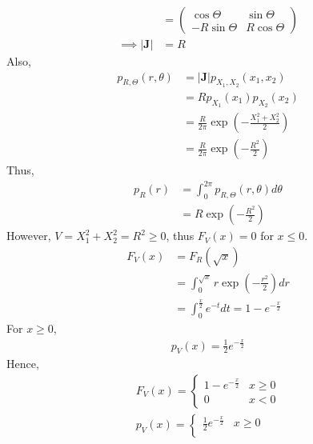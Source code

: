 \documentclass[journal,12pt,twocolumn]{IEEEtran}
\numberwithin{equation}{section}
\renewcommand\thesection{\arabic{section}}
\providecommand{\brak}[1]{\ensuremath{\left(#1\right)}}
\providecommand{\mtx}[1]{\mathbf{#1}}
\newcommand{\myvec}[1]{\ensuremath{\begin{pmatrix}#1\end{pmatrix}}}
\begin{document}
\begin{enumerate}[label=\thesection.\arabic*
        ,ref=\thesection.\theenumi]
\begin{align}
                                 & = \myvec{\cos{\Theta}   & \sin{\Theta}   \\ -R\sin{\Theta}     & R\cos{\Theta}}              \\
              \implies |\mtx{J}| & = R
          \end{align}
          Also,
          \begin{align}
              p_{R, \Theta}(r, \theta) & = |\mtx{J}|p_{X_1, X_2}(x_1, x_2)                     \\
                                       & = Rp_{X_1}(x_1)p_{X_2}(x_2)                           \\
                                       & = \frac{R}{2\pi}\exp{\brak{-\frac{X_1^2 + X_2^2}{2}}} \\
                                       & = \frac{R}{2\pi}\exp{\brak{-\frac{R^2}{2}}}
              \label{eq:joint}
          \end{align}
          Thus,
          \begin{align}
              p_R(r) & = \int_{0}^{2\pi}p_{R, \Theta}(r, \theta) d\theta \\
                     & = R\exp{\brak{-\frac{R^2}{2}}}
          \end{align}
          However, $V = X_1^2 + X_2^2 = R^2 \geq 0$, thus $F_V(x) = 0$ for $x \leq 0$.
          \begin{align}
              F_V(x) & = F_R(\sqrt{x})                                         \\
                     & = \int_{0}^{\sqrt{x}}r\exp{\brak{-\frac{r^2}{2}}}dr     \\
                     & = \int_{0}^{\frac{x}{2}}e^{-t}dt = 1 - e^{-\frac{x}{2}}
          \end{align}
          For $x \geq 0$,
          \begin{align}
              p_V(x) = \frac{1}{2}e^{-\frac{x}{2}}
          \end{align}
          Hence,
          \begin{align}
              F_V(x) =
              \begin{cases}
                  1 - e^{-\frac{x}{2}} & x \geq 0 \\
                  0                    & x < 0
              \end{cases} \label{eq:chi-cdf} \\
              p_V(x) =
              \begin{cases}
                  \frac{1}{2}e^{-\frac{x}{2}} & x \geq 0 \\

\end{cases}
\end{align}
\end{enumerate}
\end{document}
